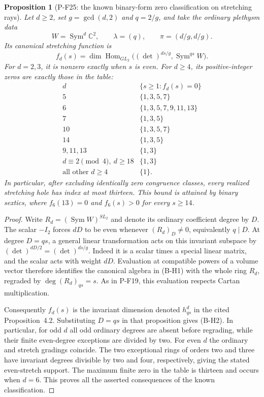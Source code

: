 \documentclass[11pt,a4paper]{article}
\newtheorem{proposition}{Proposition}[section]
\begin{document}
\begin{proposition}[P-F25: the known binary-form zero classification on stretching rays]
\label{prop:binarydeterminantzeros}
Let $d\ge2$, set $g=\gcd(d,2)$ and $q=2/g$, and take the ordinary
plethysm data
\[
 W=\operatorname{Sym}^d\mathbb C^2,\qquad
 \lambda=(q),\qquad \pi=(d/g,d/g).
\]
Its canonical stretching function is
\[
 f_d(s)=\dim\operatorname{Hom}_{GL_2}
   \bigl((\det)^{ds/g},\operatorname{Sym}^{qs}W\bigr).
 \tag{B-H1}
\]
For $d=2,3$, it is nonzero exactly when $s$ is even.
For $d\ge4$, its positive-integer zeros are exactly those in the table:
\[
\begin{array}{c|l}
 d&\{s\ge1:f_d(s)=0\}\\ \hline
 5&\{1,3,5,7\}\\
 6&\{1,3,5,7,9,11,13\}\\
 7&\{1,3,5\}\\
 10&\{1,3,5,7\}\\
 14&\{1,3,5\}\\
 9,11,13&\{1,3\}\\
 d\equiv2\pmod4,\ d\ge18&\{1,3\}\\
 \text{all other }d\ge4&\{1\}.
\end{array}
 \tag{B-H2}
\]
In particular, after excluding identically zero congruence classes,
every realized stretching hole has index at most thirteen. This
bound is attained by binary sextics, where $f_6(13)=0$ and
$f_6(s)>0$ for every $s\ge14$.
\end{proposition}

\begin{proof}
Write $R_d=(\operatorname{Sym}W)^{SL_2}$ and denote its ordinary
coefficient degree by $D$. The scalar $-I_2$ forces $dD$ to be
even whenever $(R_d)_D\ne0$, equivalently $q\mid D$.
At degree $D=qs$, a general linear transformation acts on this
invariant subspace by $(\det)^{dD/2}=(\det)^{ds/g}$.
Indeed it is a scalar times a special linear matrix, and the scalar
acts with weight $dD$. Evaluation at compatible powers of a volume
vector therefore identifies the canonical algebra in (B-H1) with
the whole ring $R_d$, regraded by $\deg (R_d)_{qs}=s$.
As in P-F19, this evaluation respects Cartan multiplication.

Consequently $f_d(s)$ is the invariant dimension denoted
$h^d_{qs}$ in the cited Proposition~4.2. Substituting $D=qs$ in
that proposition gives (B-H2). In particular, for odd $d$ all odd
ordinary degrees are absent before regrading, while their finite
even-degree exceptions are divided by two. For even $d$ the
ordinary and stretch gradings coincide. The two exceptional rings
of orders two and three have invariant degrees divisible by two
and four, respectively, giving the stated even-stretch support.
The maximum finite zero in the table is thirteen and occurs when
$d=6$. This proves all the asserted consequences of the known
classification.
\end{proof}
\end{document}
